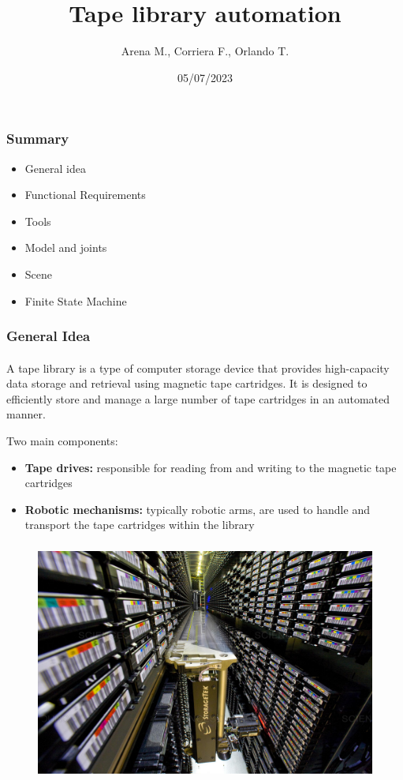 \documentclass[12pt]{beamer}
\title{Tape library automation}
\author{Arena M., Corriera F., Orlando T.}
\institute{Università degli studi di Messina}
\date{05/07/2023}
\begin{document}
\begin{frame}
\maketitle
\end{frame}

\begin{frame}
\frametitle{Summary}
\begin{itemize}
\item General idea
\item Functional Requirements
\item Tools
\item Model and joints
\item Scene
\item Finite State Machine
\end{itemize}
\end{frame}

\begin{frame}
\frametitle{General Idea}
\framesubtitle{}
A tape library is a type of computer storage device that provides high-capacity data storage and retrieval using magnetic tape cartridges. It is designed to efficiently store and manage a large number of tape cartridges in an automated manner.

Two main components:
\begin{itemize}
    \item \textbf{Tape drives:} responsible for reading from and writing to the magnetic tape cartridges
    \item \textbf{Robotic mechanisms:} typically robotic arms, are used to handle and transport the tape cartridges within the library
\end{itemize}
\end{frame}

\begin{frame}
\frametitle{}
\framesubtitle{}
\begin{figure}
    \centering
    \includegraphics[trim={0 0 0 0}, clip, scale=.26]{img/storagetek_robot.jpg}
    \label{fig:tape_library}
\end{figure}
\end{frame}
\end{document}
